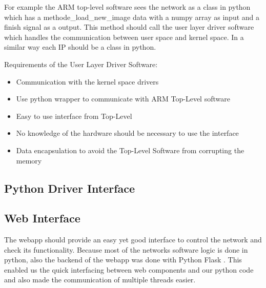 For example the ARM top-level software sees the network as a class in python which has a methode\_load\_new\_image data with a numpy array as input and a finish signal as a output. This method should call the user layer driver software which handles the communication between user space and kernel space. In a similar way each IP should be a class in python. 

Requirements of the User Layer Driver Software:
\begin{itemize} 
	\item Communication with the kernel space drivers 
	\item Use python wrapper to communicate with ARM Top-Level software
	\item Easy to use interface from Top-Level 
	\item No knowledge of the hardware should be necessary to use the interface
	\item Data encapsulation to avoid the Top-Level Software from corrupting the memory 
\end{itemize}

\subsection{Python Driver Interface}

\subsection{Web Interface}

The webapp should provide an easy yet good interface to control the network and check its functionality. Because most of the networks software logic is done in python, also the backend of the webapp was done with Python Flask \cite{Pallets:2020aa}. This enabled us the quick interfacing between web components and our python code and also made the communication of multiple threads easier.





